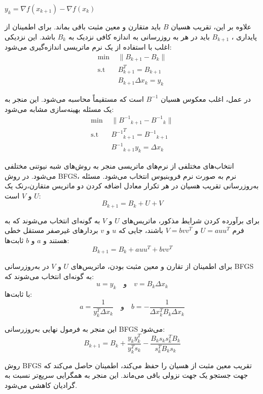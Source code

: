 \documentclass{article}
\begin{document}
\hspace{0.3cm}\( y_k = \nabla f(x_{k+1}) - \nabla f(x_k) \)
\vspace{0.3cm}

علاوه بر این، تقریب هسیان \( B \) باید متقارن و معین مثبت باقی بماند. برای اطمینان از پایداری ، \( B_{k+1} \) باید در هر به‌ روزرسانی به اندازه کافی نزدیک به \( B_k \) باشد. این نزدیکی اغلب با استفاده از یک نرم ماتریسی اندازه‌گیری می‌شود:
\begin{align}
\min &\| B_{k+1} - B_k \| \\
\text{s.t} \quad &B_{k+1}^T = B_{k+1} \\
&B_{k+1} \Delta x_k = y_k
\end{align}

در عمل، اغلب معکوس هسیان \( B^{-1} \) است که مستقیماً محاسبه می‌شود. این منجر به یک مسئله بهینه‌سازی مشابه می‌شود:
\begin{align}
\min &\| {B^{-1}}_{k+1} - {B^{-1}}_k \| \\
\text{s.t} \quad &{B^{-1}}_{k+1}^T = {B^{-1}}_{k+1} \\
&{B^{-1}}_{k+1} y_k = \Delta x_k
\end{align}

انتخاب‌های مختلفی از نرم‌های ماتریسی منجر به روش‌های شبه نیوتنی مختلفی می‌شود. در روش BFGS، نرم به صورت نرم فروبنیوس انتخاب می‌شود. مسئله به‌روزرسانی تقریب هسیان در هر تکرار معادل اضافه کردن دو ماتریس متقارن،رنک یک \( U \) و \( V \) است:
\begin{equation}
B_{k+1} = B_k + U + V
\end{equation}

برای برآورده کردن شرایط مذکور، ماتریس‌های \( U \) و \( V \) به گونه‌ای انتخاب می‌شوند که به فرم \( U = a uu^T \) و \( V = b vv^T \) باشند، جایی که \( u \) و \( v \) بردارهای غیرصفر مستقل خطی هستند و \( a \) و \( b \) ثابت‌ها:
\begin{equation}
B_{k+1} = B_k + auu^T + bvv^T
\end{equation}

برای اطمینان از تقارن و معین مثبت بودن، ماتریس‌های \( U \) و \( V \) در به‌روزرسانی BFGS به گونه‌ای انتخاب می‌شوند که:
\begin{equation}
u = y_k \quad \text{و} \quad v = B_k \Delta x_k
\end{equation}
با ثابت‌ها:
\begin{equation}
a = \frac{1}{y_k^T \Delta x_k} \quad \text{و} \quad b = -\frac{1}{\Delta x_k^T B_k \Delta x_k}
\end{equation}

این منجر به فرمول نهایی به‌روزرسانی BFGS می‌شود:
\begin{equation}
B_{k+1} = B_k + \frac{y_k y_k^T}{y_k^T s_k} - \frac{B_k s_k s_k^T B_k}{s_k^T B_k s_k}
\end{equation}

روش BFGS تقریب معین مثبت از هسیان را حفظ می‌کند، اطمینان حاصل می‌کند که جهت جستجو یک جهت نزولی باقی می‌ماند. این منجر به همگرایی سریع‌تر نسبت به گرادیان کاهشی  می‌شود.
\end{document}
